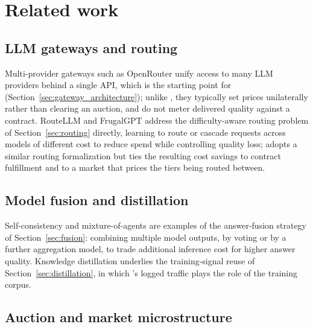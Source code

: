 \section{Related work}
\label{sec:related_work}

\subsection{LLM gateways and routing}
\label{sec:related_gateways}

Multi-provider gateways such as OpenRouter unify access to many LLM
providers behind a single API, which is the starting point for \NoesisServer{}
(Section~\ref{sec:gateway_architecture}); unlike \Noesis, they typically set
prices unilaterally rather than clearing an auction, and do not meter delivered
quality against a contract. RouteLLM \cite{routellm2024} and FrugalGPT
\cite{frugalgpt2023} address the difficulty-aware routing problem of
Section~\ref{sec:routing} directly, learning to route or cascade requests
across models of different cost to reduce spend while controlling quality loss;
\Noesis{} adopts a similar routing formalization but ties the resulting cost
savings to contract fulfillment and to a market that prices the tiers being
routed between.

\subsection{Model fusion and distillation}
\label{sec:related_fusion}

Self-consistency \cite{wang2022selfconsistency} and mixture-of-agents
\cite{wang2024moa} are examples of the answer-fusion strategy of
Section~\ref{sec:fusion}: combining multiple model outputs, by voting or by
a further aggregation model, to trade additional inference cost for
higher answer quality. Knowledge distillation \cite{hinton2015} underlies
the training-signal reuse of Section~\ref{sec:distillation}, in which
\NoesisServer{}'s logged traffic plays the role of the training corpus.

\subsection{Auction and market microstructure}
\label{sec:related_auctions}

